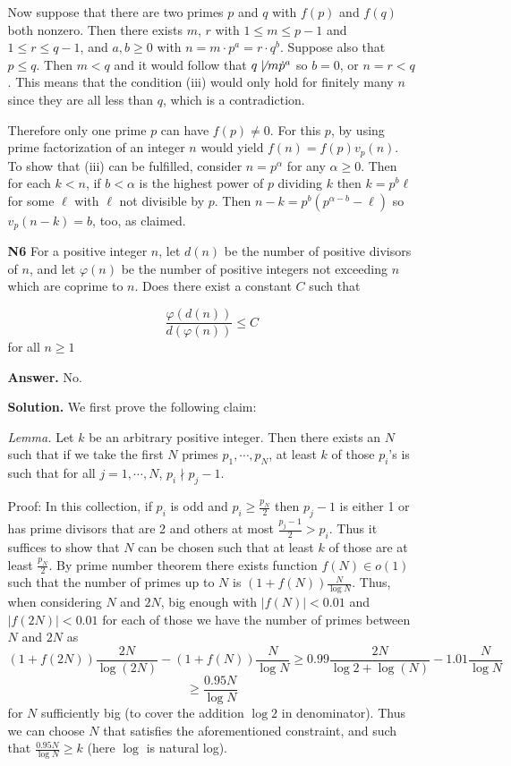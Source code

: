\documentclass[11pt,a4paper]{article}
\begin{document}
\begin{enumerate}
\begin{enumerate}
		Now suppose that there are two primes $p$ and $q$ with $f(p)$ and $f(q)$ both nonzero. Then there exists $m$, $r$ with $1\le m\le p-1$ and $1\le r\le q-1$, and $a, b\ge 0$ with $n=m\cdot p^a=r\cdot q^b$. 
		Suppose also that $p\le q$. 
		Then $m<q$ and it would follow that $q\not\mid m\dot p^a$ so $b=0$, or $n=r < q$. This means that the condition (iii) would only hold for finitely many $n$ since they are all less than $q$, which is a contradiction. 
		
		Therefore only one prime $p$ can have $f(p)\neq 0$. For this $p$, by using prime factorization of an integer $n$ would yield $f(n)=f(p)v_p(n)$. To show that (iii) can be fulfilled, consider $n=p^{\alpha}$ for any $\alpha\ge 0$. Then for each $k<n$, if $b<\alpha$ is the highest power of $p$ dividing $k$ then $k=p^b\ell$ for some $\ell$ with $\ell$ not divisible by $p$. 
		Then $n-k=p^{b}(p^{\alpha-b}-\ell)$ so $v_p(n-k)=b$, too, as claimed. 
		
		\item[\textbf{N6}]
		For a positive integer $n$, let $d(n)$ be the number of positive divisors of $n$, and let $\varphi(n)$ be the number of positive integers not exceeding $n$ which are coprime to $n$. Does there exist a constant $C$ such that
		
		$$ \frac {\varphi ( d(n))}{d(\varphi(n))}\le C$$for all $n\ge 1$
		
		\textbf{Answer.} No. 
		
		\textbf{Solution.} 
		We first prove the following claim: 
		
		\emph{Lemma.} 
		Let $k$ be an arbitrary positive integer. Then there exists an $N$ such that if we take the first $N$ primes $p_1, \cdots, p_N$, 
		at least $k$ of those $p_i$'s is such that for all $j=1, \cdots, N$, $p_i\nmid p_j-1$. 
		
		Proof: In this collection, if $p_i$ is odd and $p_i\ge \frac{p_N}{2}$ then 
		$p_j-1$ is either 1 or has prime divisors that are 2 and others at most $\frac{p_j-1}{2}>p_i$. 
		Thus it suffices to show that $N$ can be chosen such that at least $k$ of those are at least $\frac{p_N}{2}$. 
		By prime number theorem there exists function $f(N)\in o(1)$ such that the number of primes up to $N$ is $(1+f(N))\frac{N}{\log N}$. 
		Thus, when considering $N$ and $2N$, big enough with $|f(N)|<0.01$ and $|f(2N)|<0.01$ for each of those we have the number of primes between $N$ and $2N$ as 
		\[
		(1+f(2N))\frac{2N}{\log (2N)} - (1+f(N))\frac{N}{\log N}
		\ge 0.99\frac{2N}{\log 2 + \log (N)} - 1.01\frac{N}{\log N}
		\]
		\[
		\ge\frac{0.95N}{\log N}
		\]
		for $N$ sufficiently big (to cover the addition $\log 2$ in denominator). 
		Thus we can choose $N$ that satisfies the aforementioned constraint, and such that $ \frac{0.95N}{\log N}\ge k$ (here $\log$ is natural log). 
		

\end{enumerate}
\end{enumerate}
\end{document}
